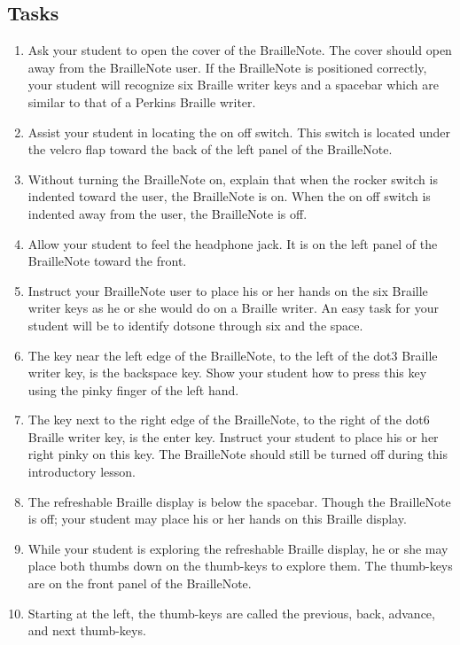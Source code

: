\documentclass[10pt,letterpaper,twoside]{report}
\begin{document}
{{{{\subsection{Tasks}
\begin{enumerate}
	\item Ask your student to open the cover of the BrailleNote. The cover should open away from the BrailleNote user.  If the BrailleNote is positioned correctly, your student will recognize six Braille writer keys and a spacebar which are similar to that of a Perkins Braille writer.
	      
	\item Assist your student in locating the on off switch.  This switch is located under the velcro flap toward the back of the left panel of the BrailleNote.
	      
	\item Without turning the BrailleNote on, explain that when the rocker switch is indented toward the user, the BrailleNote is on.  When the on off switch is indented away from the user, the BrailleNote is off.
	      
	\item Allow your student to feel the headphone jack.  It is on the left panel of the BrailleNote toward the front.
	      
	\item Instruct your BrailleNote user to place his or her hands on the six Braille writer keys as he or she would do on a Braille writer.  An easy task for your student will be to identify dotsone through six and the space.
	      
	      
	      
	\item The key near the left edge of the BrailleNote, to the left of the dot3 Braille writer key, is the backspace key.  Show your student how to press this key using the pinky finger of the left hand.
	      
	      
	      
	\item The key next to the right edge of the BrailleNote, to the right of the dot6 Braille writer key, is the enter key.  Instruct your student to place his or her right pinky on this key.  The BrailleNote should still be turned off during this introductory lesson.
	      
	      
	      
	\item The refreshable Braille display is below the spacebar.  Though the BrailleNote is off; your student may place his or her hands on this Braille display.
	\item While your student is exploring the refreshable Braille display, he or she may place both thumbs down on the thumb-keys to explore them.  The thumb-keys are on the front panel of the BrailleNote.
	\item Starting at the left, the thumb-keys are called the previous, back, advance, and next thumb-keys.
\end{enumerate}
}}}}
\end{document}

